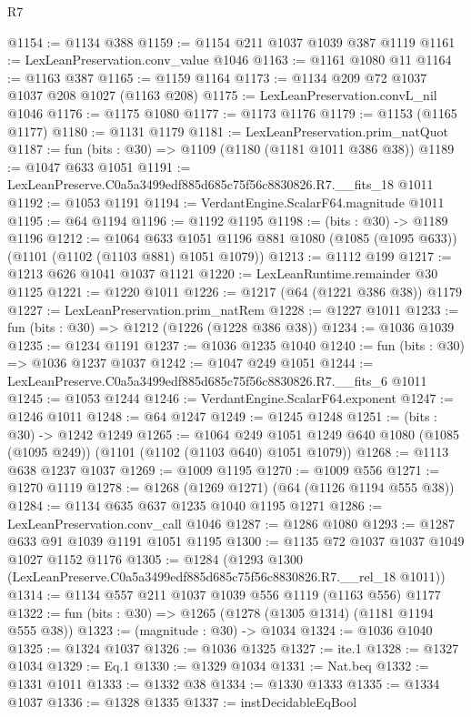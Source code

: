 \begin{lexlean}{R7}
\begin{coremodule}
@1154 := @1134 @388
@1159 := @1154 @211 @1037 @1039 @387 @1119
@1161 := LexLeanPreservation.conv_value @1046
@1163 := @1161 @1080 @11
@1164 := @1163 @387
@1165 := @1159 @1164
@1173 := @1134 @209 @72 @1037 @1037 @208 @1027 (@1163 @208)
@1175 := LexLeanPreservation.convL_nil @1046
@1176 := @1175 @1080
@1177 := @1173 @1176
@1179 := @1153 (@1165 @1177)
@1180 := @1131 @1179
@1181 := LexLeanPreservation.prim_natQuot
@1187 := fun (bits : @30) => @1109 (@1180 (@1181 @1011 @386 @38))
@1189 := @1047 @633 @1051
@1191 := LexLeanPreserve.C0a5a3499edf885d685c75f56c8830826.R7.__fits_18 @1011
@1192 := @1053 @1191
@1194 := VerdantEngine.ScalarF64.magnitude @1011
@1195 := @64 @1194
@1196 := @1192 @1195
@1198 := (bits : @30) -> @1189 @1196
@1212 := @1064
    @633
    @1051
    @1196
    @881
    @1080
    (@1085 (@1095 @633))
    (@1101 (@1102 (@1103 @881) @1051 @1079))
@1213 := @1112 @199
@1217 := @1213 @626 @1041 @1037 @1121
@1220 := LexLeanRuntime.remainder @30 @1125
@1221 := @1220 @1011
@1226 := @1217 (@64 (@1221 @386 @38)) @1179
@1227 := LexLeanPreservation.prim_natRem
@1228 := @1227 @1011
@1233 := fun (bits : @30) => @1212 (@1226 (@1228 @386 @38))
@1234 := @1036 @1039
@1235 := @1234 @1191
@1237 := @1036 @1235 @1040
@1240 := fun (bits : @30) => @1036 @1237 @1037
@1242 := @1047 @249 @1051
@1244 := LexLeanPreserve.C0a5a3499edf885d685c75f56c8830826.R7.__fits_6 @1011
@1245 := @1053 @1244
@1246 := VerdantEngine.ScalarF64.exponent
@1247 := @1246 @1011
@1248 := @64 @1247
@1249 := @1245 @1248
@1251 := (bits : @30) -> @1242 @1249
@1265 := @1064
    @249
    @1051
    @1249
    @640
    @1080
    (@1085 (@1095 @249))
    (@1101 (@1102 (@1103 @640) @1051 @1079))
@1268 := @1113 @638 @1237 @1037
@1269 := @1009 @1195
@1270 := @1009 @556
@1271 := @1270 @1119
@1278 := @1268 (@1269 @1271) (@64 (@1126 @1194 @555 @38))
@1284 := @1134 @635 @637 @1235 @1040 @1195 @1271
@1286 := LexLeanPreservation.conv_call @1046
@1287 := @1286 @1080
@1293 := @1287 @633 @91 @1039 @1191 @1051 @1195
@1300 := @1135 @72 @1037 @1037 @1049 @1027 @1152 @1176
@1305 := @1284 (@1293 @1300 (LexLeanPreserve.C0a5a3499edf885d685c75f56c8830826.R7.__rel_18 @1011))
@1314 := @1134 @557 @211 @1037 @1039 @556 @1119 (@1163 @556) @1177
@1322 := fun (bits : @30) => @1265 (@1278 (@1305 @1314) (@1181 @1194 @555 @38))
@1323 := (magnitude : @30) -> @1034
@1324 := @1036 @1040
@1325 := @1324 @1037
@1326 := @1036 @1325
@1327 := ite.{1}
@1328 := @1327 @1034
@1329 := Eq.{1}
@1330 := @1329 @1034
@1331 := Nat.beq
@1332 := @1331 @1011
@1333 := @1332 @38
@1334 := @1330 @1333
@1335 := @1334 @1037
@1336 := @1328 @1335
@1337 := instDecidableEqBool

\end{coremodule}
\end{lexlean}
